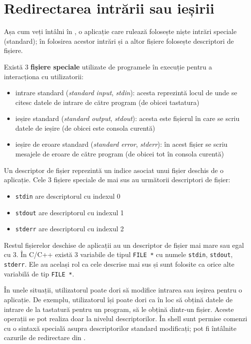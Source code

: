\section{Redirectarea intrării sau ieșirii}
\label{sec:fs:redirect}

Așa cum veți întâlni în , o aplicație care rulează folosește niște intrări speciale (standard); în folosirea acestor intrări și a altor fișiere folosește descriptori de fișiere.

Există 3 \textbf{fișiere speciale} utilizate de programele în execuție pentru a interacționa cu utilizatorii:

\begin{itemize}
  \item intrare standard (\textit{standard input}, \textit{stdin}): acesta reprezintă locul de unde se citesc datele de intrare de către program (de obicei tastatura)
  \item ieșire standard (\textit{standard output}, \textit{stdout}): acesta este fișierul în care se scriu datele de ieșire (de obicei este consola curentă)
  \item ieșire de eroare standard (\textit{standard error}, \textit{stderr}): în acest fișier se scriu mesajele de eroare de către program (de obicei tot în consola curentă)
\end{itemize}

Un descriptor de fișier reprezintă un indice asociat unui fișier deschis de o aplicație. Cele 3 fișiere speciale de mai sus au următorii descriptori de fișier:

\begin{itemize}
  \item \texttt{stdin} are descriptorul cu indexul 0
  \item \texttt{stdout} are descriptorul cu indexul 1
  \item \texttt{stderr} are descriptorul cu indexul 2
\end{itemize}

Restul fișierelor deschise de aplicații au un descriptor de fișier mai mare sau egal cu 3. În C/C++ există 3 variabile de tipul \texttt{FILE *} cu numele \texttt{stdin}, \texttt{stdout}, \texttt{stderr}. Ele au același rol ca cele descrise mai sus și sunt folosite ca orice alte variabilă de tip \texttt{FILE *}.

În unele situații, utilizatorul poate dori să modifice intrarea sau ieșirea pentru o aplicație. De exemplu, utilizatorul își poate dori ca în loc să obțină datele de intrare de la tastatură pentru un program, să le obțină dintr-un fișier. Aceste operații se pot realiza doar la nivelul descriptorilor. În shell sunt permise comenzi cu o sintaxă specială asupra descriptorilor standard modificați; pot fi întâlnite cazurile de redirectare din .

